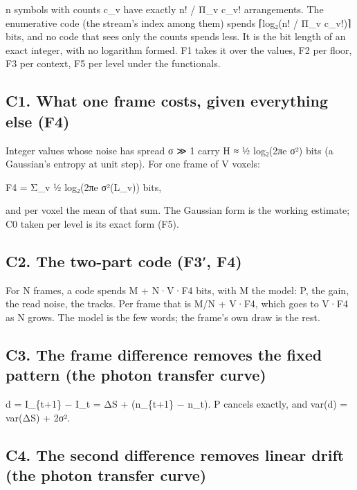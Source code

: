 n symbols with counts c\_\allowbreak{}v have exactly n! / Π\_\allowbreak{}v c\_\allowbreak{}v! arrangements. The enumerative code (the stream's index among them) spends ⌈log₂(n! / Π\_\allowbreak{}v c\_\allowbreak{}v!)⌉ bits, and no code that sees only the counts spends less. It is the bit length of an exact integer, with no logarithm formed. F1 takes it over the values, F2 per floor, F3 per context, F5 per level under the functionals.

\subsection{\texorpdfstring{C1. What one frame costs, given everything else (F4)}{C1. What one frame costs, given everything else (F4)}}

Integer values whose noise has spread σ ≫ 1 carry H ≈ ½ log₂(2πe σ²) bits (a Gaussian's entropy at unit step). For one frame of V voxels:

F4 = Σ\_\allowbreak{}v ½ log₂(2πe σ²(L\_\allowbreak{}v)) bits,

and per voxel the mean of that sum. The Gaussian form is the working estimate; C0 taken per level is its exact form (F5).

\subsection{\texorpdfstring{C2. The two-part code (F3′, F4)}{C2. The two-part code (F3′, F4)}}

For N frames, a code spends M + N·V·F4 bits, with M the model: P, the gain, the read noise, the tracks. Per frame that is M/N + V·F4, which goes to V·F4 as N grows. The model is the few words; the frame's own draw is the rest.

\subsection{\texorpdfstring{C3. The frame difference removes the fixed pattern (the photon transfer curve)}{C3. The frame difference removes the fixed pattern (the photon transfer curve)}}

d = I\_\allowbreak{}\{t+1\} − I\_\allowbreak{}t = ΔS + (n\_\allowbreak{}\{t+1\} − n\_\allowbreak{}t). P cancels exactly, and var(d) = var(ΔS) + 2σ².

\subsection{\texorpdfstring{C4. The second difference removes linear drift (the photon transfer curve)}{C4. The second difference removes linear drift (the photon transfer curve)}}

